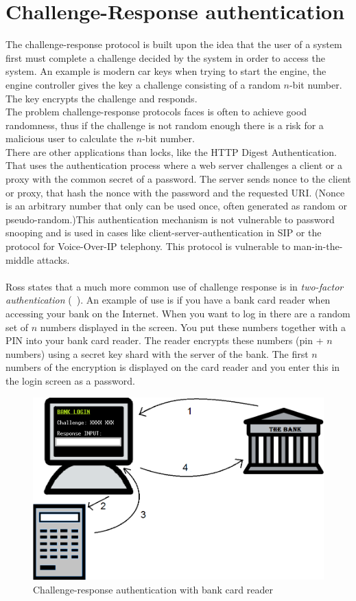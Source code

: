 \section{Challenge-Response authentication}\label{sec:challResp} 
The challenge-response protocol is built upon the idea that the user of a system first must complete a challenge decided by the system in order to access the system. An example is modern car keys when trying to start the engine, the engine controller gives the key a challenge consisting of a random $n$-bit number. The key encrypts the challenge and responds. \\
The problem challenge-response protocols faces is often to achieve good randomness, thus if the challenge is not random enough there is a risk for a malicious user to calculate the $n$-bit number. \\
There are other applications than locks, like the HTTP Digest Authentication. That uses the authentication process where a web server challenges a client or a proxy with the common secret of a password. The server sends nonce to the client or proxy, that hash the nonce with the password and the requested URI. (Nonce is an arbitrary number that only can be used once, often generated as random or pseudo-random.)This authentication mechanism is not vulnerable to password snooping and is used in cases like client-server-authentication in SIP or the protocol for Voice-Over-IP telephony. This protocol is vulnerable to man-in-the-middle attacks. \\
\\
Ross states that a much more common use of challenge response is in \textit{two-factor authentication} (~). An example of use is if you have a bank card reader when accessing your bank on the Internet. When you want to log in there are a random set of $n$ numbers displayed in the screen. You put these numbers together with a PIN into your bank card reader. The reader encrypts these numbers (pin + $n$ numbers) using a secret key shard with the server of the bank. The first $n$ numbers of the encryption is displayed on the card reader and you enter this in the login screen as a password.
\newpage
\begin{figure}[h]
	\centering
    \includegraphics[scale=0.4]{img/challenge-response-bank}
    \caption{Challenge-response authentication with bank card reader}
  \label{fig:challengeResponse}
\end{figure}
